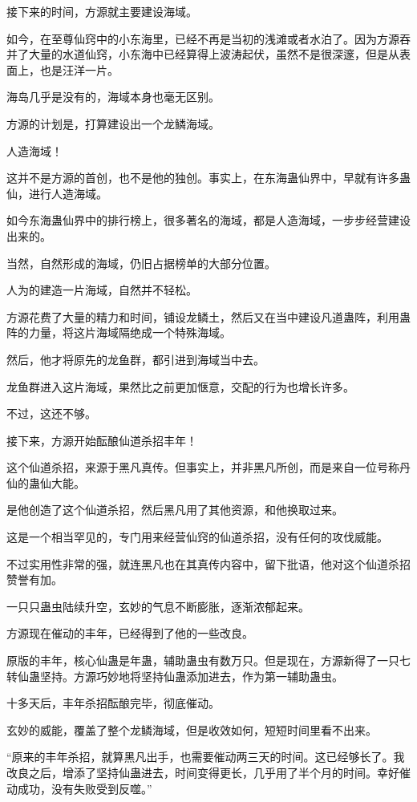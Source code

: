\begin{this_body}
接下来的时间，方源就主要建设海域。

如今，在至尊仙窍中的小东海里，已经不再是当初的浅滩或者水泊了。因为方源吞并了大量的水道仙窍，小东海中已经算得上波涛起伏，虽然不是很深邃，但是从表面上，也是汪洋一片。

海岛几乎是没有的，海域本身也毫无区别。

方源的计划是，打算建设出一个龙鳞海域。

人造海域！

这并不是方源的首创，也不是他的独创。事实上，在东海蛊仙界中，早就有许多蛊仙，进行人造海域。

如今东海蛊仙界中的排行榜上，很多著名的海域，都是人造海域，一步步经营建设出来的。

当然，自然形成的海域，仍旧占据榜单的大部分位置。

人为的建造一片海域，自然并不轻松。

方源花费了大量的精力和时间，铺设龙鳞土，然后又在当中建设凡道蛊阵，利用蛊阵的力量，将这片海域隔绝成一个特殊海域。

然后，他才将原先的龙鱼群，都引进到海域当中去。

龙鱼群进入这片海域，果然比之前更加惬意，交配的行为也增长许多。

不过，这还不够。

接下来，方源开始酝酿仙道杀招丰年！

这个仙道杀招，来源于黑凡真传。但事实上，并非黑凡所创，而是来自一位号称丹仙的蛊仙大能。

是他创造了这个仙道杀招，然后黑凡用了其他资源，和他换取过来。

这是一个相当罕见的，专门用来经营仙窍的仙道杀招，没有任何的攻伐威能。

不过实用性非常的强，就连黑凡也在其真传内容中，留下批语，他对这个仙道杀招赞誉有加。

一只只蛊虫陆续升空，玄妙的气息不断膨胀，逐渐浓郁起来。

方源现在催动的丰年，已经得到了他的一些改良。

原版的丰年，核心仙蛊是年蛊，辅助蛊虫有数万只。但是现在，方源新得了一只七转仙蛊坚持。方源巧妙地将坚持仙蛊添加进去，作为第一辅助蛊虫。

十多天后，丰年杀招酝酿完毕，彻底催动。

玄妙的威能，覆盖了整个龙鳞海域，但是收效如何，短短时间里看不出来。

“原来的丰年杀招，就算黑凡出手，也需要催动两三天的时间。这已经够长了。我改良之后，增添了坚持仙蛊进去，时间变得更长，几乎用了半个月的时间。幸好催动成功，没有失败受到反噬。”


\end{this_body}
